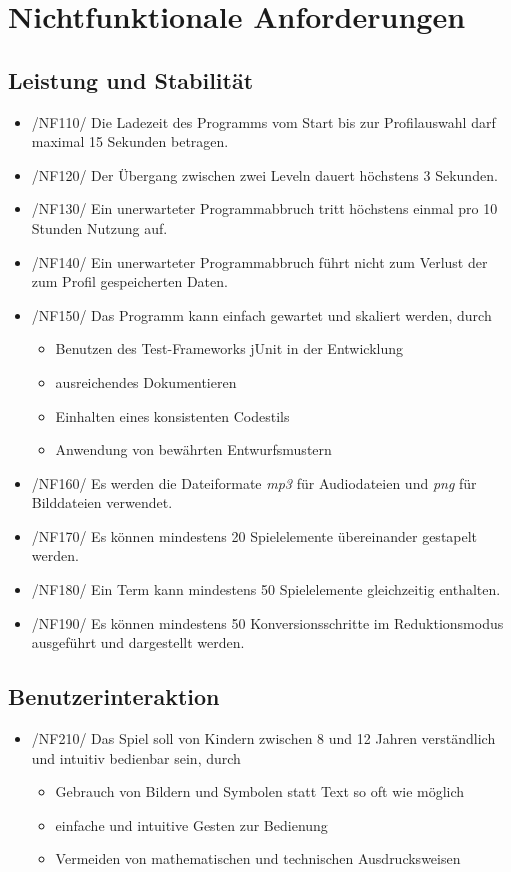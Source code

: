 \section{Nichtfunktionale Anforderungen}

\subsection{Leistung und Stabilität}

\begin{itemize}
\item /NF110/ Die Ladezeit des Programms vom Start bis zur Profilauswahl darf maximal 15 Sekunden betragen.
\item /NF120/ Der \"Ubergang zwischen zwei Leveln dauert höchstens 3 Sekunden.
\item /NF130/ Ein unerwarteter Programmabbruch tritt höchstens einmal pro 10 Stunden Nutzung auf.
\item /NF140/ Ein unerwarteter Programmabbruch führt nicht zum Verlust der zum Profil gespeicherten Daten.
\item /NF150/ Das Programm kann einfach gewartet und skaliert werden, durch
\begin{itemize}
\item Benutzen des Test-Frameworks jUnit in der Entwicklung
\item ausreichendes Dokumentieren
\item Einhalten eines konsistenten Codestils
\item Anwendung von bewährten Entwurfsmustern
\end{itemize}
\item /NF160/ Es werden die Dateiformate \textit{mp3} für Audiodateien und \textit{png} für Bilddateien verwendet.
\item /NF170/ Es können mindestens 20 Spielelemente übereinander gestapelt werden.
\item /NF180/ Ein Term kann mindestens 50 Spielelemente gleichzeitig enthalten.
\item /NF190/ Es können mindestens 50 Konversionsschritte im Reduktionsmodus ausgeführt und dargestellt werden.
\end{itemize}

\subsection{Benutzerinteraktion}
\begin{itemize}
\item /NF210/ Das Spiel soll von Kindern zwischen 8 und 12 Jahren verständlich und intuitiv bedienbar sein, durch
\begin{itemize}
\item Gebrauch von Bildern und Symbolen statt Text so oft wie möglich
\item einfache und intuitive Gesten zur Bedienung
\item Vermeiden von mathematischen und technischen Ausdrucksweisen
\end{itemize}
\end{itemize}

